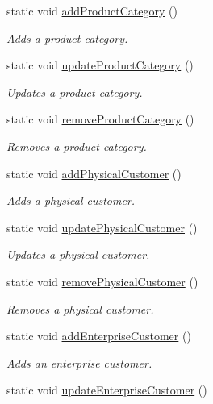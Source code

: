 \begin{DoxyCompactItemize}
static void \hyperlink{class_testing_ac90141fab2d0491c37c2226323a8da4b}{add\-Product\-Category} ()
\begin{DoxyCompactList}\small\item\em \-Adds a product category. \end{DoxyCompactList}\item 
static void \hyperlink{class_testing_acb1568a5fe98accac4ada667c30f0493}{update\-Product\-Category} ()
\begin{DoxyCompactList}\small\item\em \-Updates a product category. \end{DoxyCompactList}\item 
static void \hyperlink{class_testing_a3b6dae56c153bccc6e461a920342627c}{remove\-Product\-Category} ()
\begin{DoxyCompactList}\small\item\em \-Removes a product category. \end{DoxyCompactList}\item 
static void \hyperlink{class_testing_adfb04a3e91dd27a96499f78181c46e92}{add\-Physical\-Customer} ()
\begin{DoxyCompactList}\small\item\em \-Adds a physical customer. \end{DoxyCompactList}\item 
static void \hyperlink{class_testing_a36a65cc9cb6e49de2465d7c7e6e514bb}{update\-Physical\-Customer} ()
\begin{DoxyCompactList}\small\item\em \-Updates a physical customer. \end{DoxyCompactList}\item 
static void \hyperlink{class_testing_a1aeece0e5015f7494be8c82c96966911}{remove\-Physical\-Customer} ()
\begin{DoxyCompactList}\small\item\em \-Removes a physical customer. \end{DoxyCompactList}\item 
static void \hyperlink{class_testing_a13eac1a0ad9fb64b0c31cb958ce514de}{add\-Enterprise\-Customer} ()
\begin{DoxyCompactList}\small\item\em \-Adds an enterprise customer. \end{DoxyCompactList}\item 
static void \hyperlink{class_testing_a30569181141ff1e23df9771697a6bc9d}{update\-Enterprise\-Customer} ()

\end{DoxyCompactItemize}
